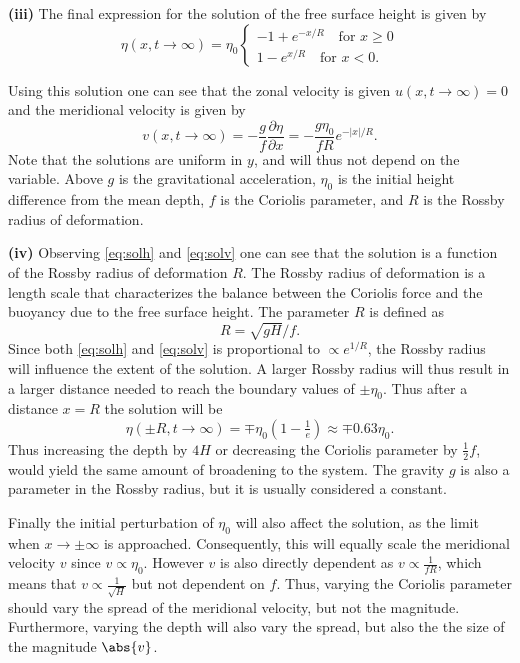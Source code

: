 \textbf{(iii)} The final expression for the solution of the free surface height is given by
\begin{equation}
    \eta(x,t\rightarrow\infty) = \eta_0 \begin{cases}
        -1 + e^{-x/R} \quad \text{for } x \geq 0 \\
        1 - e^{x/R} \quad \text{for } x < 0.
    \end{cases}
    \label{eq:solh}
\end{equation}

Using this solution one can see that the zonal velocity is given $u(x,t\rightarrow\infty)=0$ and the meridional velocity is given by
\begin{equation}
    v(x,t\rightarrow\infty) = -\frac{g}{f}\frac{\partial \eta}{\partial x} = -\frac{g\eta_0}{f R} e^{-|x|/R}.
    \label{eq:solv}
\end{equation}
Note that the solutions are uniform in $y$, and will thus not depend on the variable. Above $g$ is the gravitational acceleration, $\eta_0$ is the initial height difference from the mean depth, $f$ is the Coriolis parameter, and $R$ is the Rossby radius of deformation. 

\textbf{(iv)} Observing \autoref{eq:solh} and \autoref{eq:solv} one can see that the solution is a function of the Rossby radius of deformation $R$. The Rossby radius of deformation is a length scale that characterizes the balance between the Coriolis force and the buoyancy due to the free surface height. The parameter $R$ is defined as $$R = \sqrt{gH}/f.$$ Since both \autoref{eq:solh} and \autoref{eq:solv} is proportional to $\propto e^{1/R}$, the Rossby radius will influence the extent of the solution. A larger Rossby radius will thus result in a larger distance needed to reach the boundary values of $\pm\eta_0$. Thus after a distance $x=R$ the solution will be 
\begin{equation}
    \eta(\pm R,t\rightarrow\infty) = \mp \eta_0 \left( 1 - \tfrac{1}{e} \right) \approx\mp 0.63 \eta_0.
\end{equation}
Thus increasing the depth by $4H$ or decreasing the Coriolis parameter by $\tfrac{1}{2}f$, would yield the same amount of broadening to the system. The gravity $g$ is also a parameter in the Rossby radius, but it is usually considered a constant. 

Finally the initial perturbation of $\eta_0$ will also affect the solution, as the limit when $x\rightarrow\pm\infty$ is approached. Consequently, this will equally scale the meridional velocity $v$ since $v\propto\eta_0$. However $v$ is also directly dependent as $v\propto\tfrac{1}{fR}$, which means that $v\propto\tfrac{1}{\sqrt{H}}$ but not dependent on $f$. Thus, varying the Coriolis parameter should vary the spread of the meridional velocity, but not the magnitude. Furthermore, varying the depth will also vary the spread, but also the the size of the magnitude $\abs{v}$.  